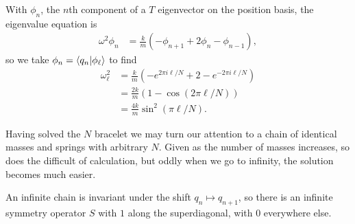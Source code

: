 \documentclass[10pt]{mypackage}
\begin{document}
\begin{example}[A Bracelet]
  With $\phi_n$, the $n$th component of a $T$ eigenvector on the position basis, the eigenvalue equation is
  \begin{align*}
    \omega^2\phi_n &= \frac{k}{m}\left(-\phi_{n+1} + 2\phi_n - \phi_{n-1}\right),
  \end{align*}
  so we take $\phi_n = \braket{q_n}{\phi_{\ell}}$ to find
  \begin{align*}
    \omega_{\ell}^2 &= \frac{k}{m}\left(-e^{2\pi i \ell/N} + 2 - e^{-2\pi i \ell/N}\right)\\
                    &=\frac{2k}{m}\left(1-\cos\left(2\pi \ell/N\right)\right)\\
                    &= \frac{4k}{m}\sin^2\left(\pi \ell/N\right).
  \end{align*}
\end{example}
\begin{example}
  Having solved the $N$ bracelet we may turn our attention to a chain of identical masses and springs with arbitrary $N$. Given as the number of masses increases, so does the difficult of calculation, but oddly when we go to infinity, the solution becomes much easier.\newline

  An infinite chain is invariant under the shift $q_n \mapsto q_{n+1}$, so there is an infinite symmetry operator $S$ with $1$ along the superdiagonal, with $0$ everywhere else.\newline


\end{example}
\end{document}
